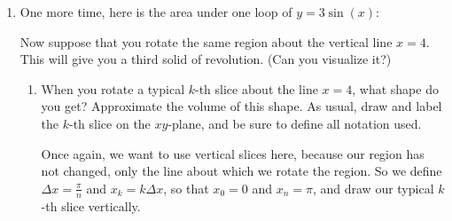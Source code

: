 \documentclass[main]{subfiles}
\begin{document}
\begin{enumerate}
\begin{enumerate}
\begin{enumerate}
\end{enumerate}

 
 \pspace{\newpage}
 
 

\item One more time, here is the area under one loop of $y=3\sin(x)$:
    
    \begin{center}
\end{center}

    
    
Now suppose that you rotate the same region about the vertical line $x = 4$. This will give you a third solid of revolution. (Can you visualize it?)

\begin{enumerate}

\item
\begin{problem}[2.7in]
When you rotate a typical $k$-th slice about the line $x = 4$, what shape do you get? Approximate the volume of this shape. As usual, draw and label the $k$-th slice on the $xy$-plane, and be sure to define all notation used.
 \end{problem}

\begin{solution}
Once again, we want to use vertical slices here, because our region has not changed, only the line about which we rotate the region. So we define $\Delta x = \frac{\pi}{n}$ and $x_k = k\Delta x$, so that $x_0=0$ and $x_n=\pi$, and draw our typical $k$-th slice vertically.


\end{solution}
\end{enumerate}
\end{enumerate}
\end{enumerate}
\end{document}
